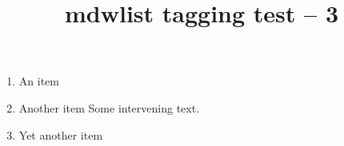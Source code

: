 \documentclass{article}
\title{mdwlist tagging test -- 3}
\begin{document}
\begin{enumerate}
\item An item
\item Another item
Some intervening text.
\item Yet another item
\end{enumerate}
\end{document}
